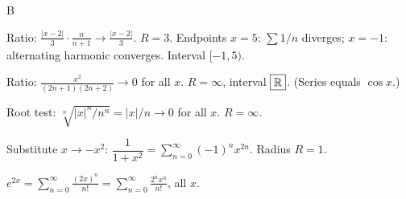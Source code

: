 \documentclass[11pt]{article}
\begin{document}
\begin{answers}{B}
\item Ratio: $\tfrac{|x-2|}{3} \cdot \tfrac{n}{n+1} \to \tfrac{|x-2|}{3}$. $R = 3$. Endpoints $x = 5$: $\sum 1/n$ diverges; $x = -1$: alternating harmonic converges. Interval $\boxed{[-1, 5)}$.
\item Ratio: $\tfrac{x^2}{(2n+1)(2n+2)} \to 0$ for all $x$. $R = \infty$, interval $\boxed{\mathbb{R}}$. (Series equals $\cos x$.)
\item Root test: $\sqrt[n]{|x|^n / n^n} = |x|/n \to 0$ for all $x$. $\boxed{R = \infty}$.
\item Substitute $x \to -x^2$: $\dfrac{1}{1 + x^2} = \displaystyle \sum_{n=0}^\infty (-1)^n x^{2n}$. Radius $\boxed{R = 1}$.
\item $e^{2x} = \displaystyle \sum_{n=0}^\infty \frac{(2x)^n}{n!} = \sum_{n=0}^\infty \frac{2^n x^n}{n!}$, all $x$.
\end{answers}
\end{document}
